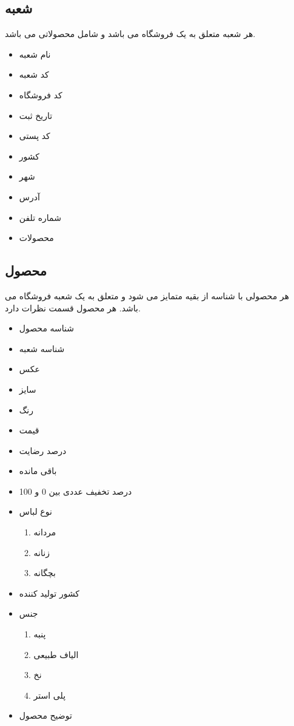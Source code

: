 \documentclass[]{article}
\begin{document}
\subsection{شعبه}
هر شعبه متعلق به یک فروشگاه می باشد و شامل محصولاتی می باشد.
\begin{itemize}
\item نام شعبه
\item کد شعبه
\item کد فروشگاه
\item تاریخ ثبت  
\item کد پستی
\item کشور
\item شهر
\item آدرس
\item شماره تلفن
\item محصولات
\end{itemize}



\subsection{محصول}
هر محصولی با شناسه از بقیه متمایز می شود و متعلق به یک شعبه فروشگاه می باشد. هر محصول قسمت نظرات دارد.
\begin{itemize}
\item شناسه محصول
\item شناسه شعبه
\item عکس
\item سایز
\item رنگ
\item قیمت
\item درصد رضایت
\item باقی مانده
\item درصد تخفیف \newline
عددی بین 0 و 100
\item  نوع لباس
\begin{enumerate}
\item مردانه
\item زنانه
\item بچگانه
\end{enumerate}
\item کشور تولید کننده
\item جنس
\begin{enumerate}
\item پنبه
\item الیاف طبیعی
\item نخ
\item پلی استر
\end{enumerate}

\item توضیح محصول

\end{itemize}
\end{document}
